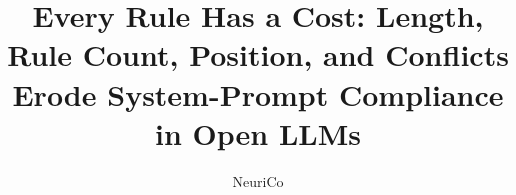 \documentclass{article}
\title{Every Rule Has a Cost: Length, Rule Count, Position, and Conflicts Erode System-Prompt Compliance in Open LLMs}
\author{NeuriCo}
\begin{document}
\maketitle

\begin{abstract}

\end{abstract}










\appendix

\end{document}
